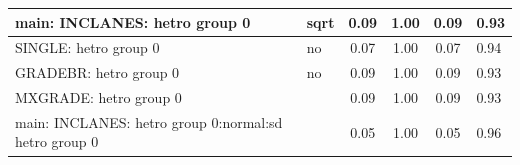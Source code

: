 \begin{table}
\begin{center}
\begin{tabular}{|l|l|c|c|c|l|}
			\hline
			main: INCLANES: hetro group 0 & sqrt & 0.09 & 1.00 & 0.09 & 0.93 \\
			\hline
			SINGLE: hetro group 0 & no & 0.07 & 1.00 & 0.07 & 0.94 \\
			\hline
			GRADEBR: hetro group 0 & no & 0.09 & 1.00 & 0.09 & 0.93 \\
			\hline
			MXGRADE: hetro group 0 &  & 0.09 & 1.00 & 0.09 & 0.93 \\
			\hline
			main: INCLANES: hetro group 0:normal:sd  hetro group 0 &  & 0.05 & 1.00 & 0.05 & 0.96 \\
			\hline
		\end{tabular}
	\end{center}
\end{table}
